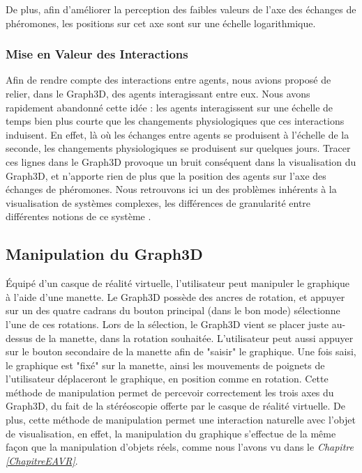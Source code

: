 	De plus, afin d'améliorer la perception des faibles valeurs de l'axe des échanges de phéromones, les positions sur cet axe sont sur une échelle logarithmique.
	
	\subsubsection{Mise en Valeur des Interactions}
	Afin de rendre compte des interactions entre agents, nous avions proposé de relier, dans le Graph3D, des agents interagissant entre eux. Nous avons rapidement abandonné cette idée : les agents interagissent sur une échelle de temps bien plus courte que les changements physiologiques que ces interactions induisent. En effet, là où les échanges entre agents se produisent à l'échelle de la seconde, les changements physiologiques se produisent sur quelques jours. Tracer ces lignes dans le Graph3D provoque un bruit conséquent dans la visualisation du Graph3D, et n'apporte rien de plus que la position des agents sur l'axe des échanges de phéromones. Nous retrouvons ici un des problèmes inhérents à la visualisation de systèmes complexes, les différences de granularité entre différentes notions de ce système \cite{hutzler_du_2000}.
	
	\subsection{Manipulation du Graph3D}
	
		Équipé d'un casque de réalité virtuelle, l'utilisateur peut manipuler le graphique à l'aide d'une manette. Le Graph3D possède des ancres de rotation, et appuyer sur un des quatre cadrans du bouton principal (dans le bon mode) sélectionne l'une de ces rotations. Lors de la sélection, le Graph3D vient se placer juste au-dessus de la manette, dans la rotation souhaitée. L'utilisateur peut aussi appuyer sur le bouton secondaire de la manette afin de "saisir" le graphique. Une fois saisi, le graphique est "fixé" sur la manette, ainsi les mouvements de poignets de l'utilisateur déplaceront le graphique, en position comme en rotation. Cette méthode de manipulation permet de percevoir correctement les trois axes du Graph3D, du fait de la stéréoscopie offerte par le casque de réalité virtuelle. De plus, cette méthode de manipulation permet une interaction naturelle avec l'objet de visualisation, en effet, la manipulation du graphique s'effectue de la même façon que la manipulation d'objets réels, comme nous l'avons vu dans le \textit{Chapitre \ref{ChapitreEAVR}}.
		
